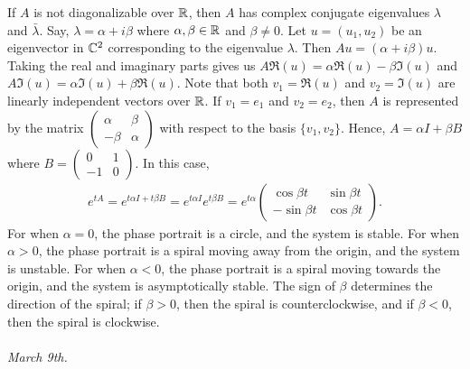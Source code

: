 If $A$ is not diagonalizable over $\mathbb{R}$, then $A$ has complex conjugate eigenvalues $\lambda$ and $\bar{\lambda}$. Say, $\lambda = \alpha + i\beta$ where $\alpha,\beta \in \mathbb{R}$ and $\beta \neq 0$. Let $u = (u_{1}, u_{2})$ be an eigenvector in $\mathbb{C}^{2}$ corresponding to the eigenvalue $\lambda$. Then $Au = (\alpha + i \beta) u$. Taking the real and imaginary parts gives us $A \Re (u) = \alpha \Re (u) - \beta \Im (u)$ and $A \Im (u) = \alpha \Im (u) + \beta \Re (u)$. Note that both $v_{1} = \Re (u)$ and $v_{2} = \Im (u)$ are linearly independent vectors over $\mathbb{R}$. If $v_{1} = e_{1}$ and $v_{2} = e_{2}$, then $A$ is represented by the matrix $\begin{pmatrix}
    \alpha & \beta \\
    -\beta & \alpha
\end{pmatrix}$ with respect to the basis $\{v_{1},v_{2}\}$. Hence, $A = \alpha I + \beta B$ where $B = \begin{pmatrix}
    0 & 1 \\
    -1 & 0
\end{pmatrix}$. In this case,
\begin{align}
    e^{tA} = e^{t\alpha I + t\beta B} = e^{t\alpha I} e^{t\beta B} = e^{t\alpha} \begin{pmatrix}
        \cos \beta t & \sin \beta t \\
        -\sin \beta t & \cos \beta t
    \end{pmatrix}.
\end{align}
For when $\alpha = 0$, the phase portrait is a circle, and the system is stable. For when $\alpha > 0$, the phase portrait is a spiral moving away from the origin, and the system is unstable. For when $\alpha < 0$, the phase portrait is a spiral moving towards the origin, and the system is asymptotically stable. The sign of $\beta$ determines the direction of the spiral; if $\beta > 0$, then the spiral is counterclockwise, and if $\beta < 0$, then the spiral is clockwise.
\\ \\
\noindent \textit{March 9th.}


